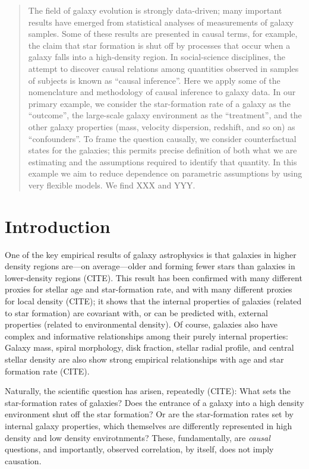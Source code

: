 \documentclass[12pt, letterpaper, preprint]{aastex}
\begin{document}
\begin{abstract}
The field of galaxy evolution is strongly data-driven; many important
results have emerged from statistical analyses of measurements of
galaxy samples.
Some of these results are presented in causal terms, for example, the
claim that star formation is shut off by processes that occur when a
galaxy falls into a high-density region.
In social-science disciplines, the attempt to discover causal
relations among quantities observed in samples of subjects is known as
``causal inference''.
Here we apply some of the nomenclature and methodology of
causal inference to galaxy data.
In our primary example, we consider the star-formation rate of a
galaxy as the ``outcome'', the large-scale galaxy environment as the
``treatment'', and the other galaxy properties (mass, velocity
dispersion, redshift, and so on) as ``confounders''.
To frame the question causally, we consider counterfactual states for
the galaxies; this permits precise definition of both what we are
estimating and the assumptions required to identify that quantity.
In this example we aim to reduce dependence on parametric assumptions
by using very flexible models.
We find XXX and YYY.
\end{abstract}

\section{Introduction}

One of the key empirical results of galaxy astrophysics is that
galaxies in higher density regions are---on average---older
and forming fewer stars than galaxies in lower-density regions (CITE).
This result has been confirmed with many different proxies for stellar
age and star-formation rate, and with many different proxies for
local density (CITE); it shows that the internal properties of galaxies
(related to star formation) are covariant with, or can be predicted
with, external properties (related to environmental density).
Of course, galaxies also have complex and informative relationships
among their purely internal properties:
Galaxy mass, spiral morphology, disk fraction, stellar radial profile,
and central stellar density are also show strong empirical
relationships with age and star formation rate (CITE).

Naturally, the scientific question has arisen, repeatedly (CITE):
What sets the star-formation rates of galaxies?
Does the entrance of a galaxy into a high density environment shut off
the star formation?
Or are the star-formation rates set by internal galaxy properties,
which themselves are differently represented in high density and low
density envirotnments?
These, fundamentally, are \emph{causal} questions, and importantly,
observed correlation, by itself, does not imply causation.
\end{document}
